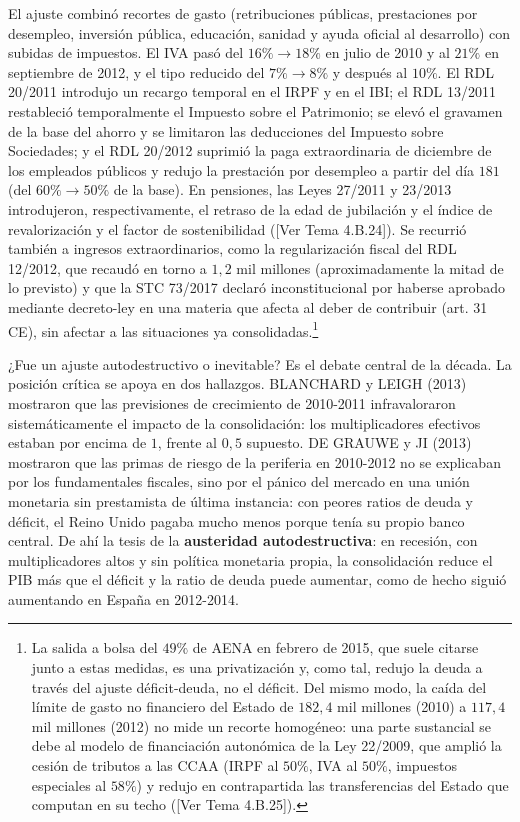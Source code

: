 \documentclass[10pt,a4paper]{article}
\newcommand{\authorfont}[1]{{\fontfamily{EBGaramond-TLF}\selectfont #1}}
\begin{document}
El ajuste combinó recortes de gasto (retribuciones públicas, prestaciones por desempleo, inversión pública, educación, sanidad y ayuda oficial al desarrollo) con subidas de impuestos. El IVA pasó del $16\%\to18\%$ en julio de 2010 y al $21\%$ en septiembre de 2012, y el tipo reducido del $7\%\to8\%$ y después al $10\%$. El RDL 20/2011 introdujo un recargo temporal en el IRPF y en el IBI; el RDL 13/2011 restableció temporalmente el Impuesto sobre el Patrimonio; se elevó el gravamen de la base del ahorro y se limitaron las deducciones del Impuesto sobre Sociedades; y el RDL 20/2012 suprimió la paga extraordinaria de diciembre de los empleados públicos y redujo la prestación por desempleo a partir del día $181$ (del $60\%\to50\%$ de la base). En pensiones, las Leyes 27/2011 y 23/2013 introdujeron, respectivamente, el retraso de la edad de jubilación y el índice de revalorización y el factor de sostenibilidad ([\authorfont{Ver Tema 4.B.24}]). Se recurrió también a ingresos extraordinarios, como la regularización fiscal del RDL 12/2012, que recaudó en torno a $1,2$ mil millones (aproximadamente la mitad de lo previsto) y que la STC 73/2017 declaró inconstitucional por haberse aprobado mediante decreto-ley en una materia que afecta al deber de contribuir (art. 31 CE), sin afectar a las situaciones ya consolidadas.\footnote{%
    La salida a bolsa del $49\%$ de AENA en febrero de 2015, que suele citarse junto a estas medidas, es una privatización y, como tal, redujo la deuda a través del ajuste déficit-deuda, no el déficit. Del mismo modo, la caída del límite de gasto no financiero del Estado de $182,4$ mil millones (2010) a $117,4$ mil millones (2012) no mide un recorte homogéneo: una parte sustancial se debe al modelo de financiación autonómica de la Ley 22/2009, que amplió la cesión de tributos a las CCAA (IRPF al $50\%$, IVA al $50\%$, impuestos especiales al $58\%$) y redujo en contrapartida las transferencias del Estado que computan en su techo ([\authorfont{Ver Tema 4.B.25}]).
}

¿Fue un ajuste autodestructivo o inevitable? Es el debate central de la década. La posición crítica se apoya en dos hallazgos. BLANCHARD y LEIGH (2013) mostraron que las previsiones de crecimiento de 2010-2011 infravaloraron sistemáticamente el impacto de la consolidación: los multiplicadores efectivos estaban por encima de $1$, frente al $0,5$ supuesto. DE GRAUWE y JI (2013) mostraron que las primas de riesgo de la periferia en 2010-2012 no se explicaban por los fundamentales fiscales, sino por el pánico del mercado en una unión monetaria sin prestamista de última instancia: con peores ratios de deuda y déficit, el Reino Unido pagaba mucho menos porque tenía su propio banco central. De ahí la tesis de la \textbf{austeridad autodestructiva}: en recesión, con multiplicadores altos y sin política monetaria propia, la consolidación reduce el PIB más que el déficit y la ratio de deuda puede aumentar, como de hecho siguió aumentando en España en 2012-2014.
\end{document}
